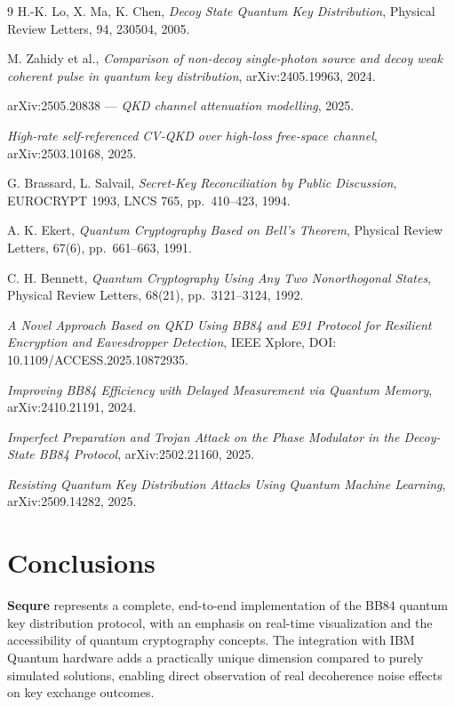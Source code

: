 \documentclass[12pt, a4paper]{article}
\begin{document}
\begin{thebibliography}{9}
    H.-K. Lo, X. Ma, K. Chen,
    \textit{Decoy State Quantum Key Distribution},
    Physical Review Letters, 94, 230504, 2005.

    M. Zahidy et al.,
    \textit{Comparison of non-decoy single-photon source and decoy weak
    coherent pulse in quantum key distribution},
    arXiv:2405.19963, 2024.

    arXiv:2505.20838 --- \textit{QKD channel attenuation modelling}, 2025.

    \textit{High-rate self-referenced CV-QKD over high-loss free-space channel},
    arXiv:2503.10168, 2025.

    G. Brassard, L. Salvail,
    \textit{Secret-Key Reconciliation by Public Discussion},
    EUROCRYPT 1993, LNCS 765, pp.\ 410--423, 1994.

    A. K. Ekert,
    \textit{Quantum Cryptography Based on Bell's Theorem},
    Physical Review Letters, 67(6), pp.\ 661--663, 1991.

    C. H. Bennett,
    \textit{Quantum Cryptography Using Any Two Nonorthogonal States},
    Physical Review Letters, 68(21), pp.\ 3121--3124, 1992.

    \textit{A Novel Approach Based on QKD Using BB84 and E91 Protocol for
    Resilient Encryption and Eavesdropper Detection},
    IEEE Xplore, DOI: 10.1109/ACCESS.2025.10872935.

    \textit{Improving BB84 Efficiency with Delayed Measurement via Quantum
    Memory}, arXiv:2410.21191, 2024.

    \textit{Imperfect Preparation and Trojan Attack on the Phase Modulator
    in the Decoy-State BB84 Protocol}, arXiv:2502.21160, 2025.

    \textit{Resisting Quantum Key Distribution Attacks Using Quantum Machine
    Learning}, arXiv:2509.14282, 2025.
\end{thebibliography}

\section{Conclusions}

\textbf{Sequre} represents a complete, end-to-end implementation of the BB84
quantum key distribution protocol, with an emphasis on real-time visualization
and the accessibility of quantum cryptography concepts. The integration with IBM
Quantum hardware adds a practically unique dimension compared to purely simulated
solutions, enabling direct observation of real decoherence noise effects on key
exchange outcomes.
\end{document}
